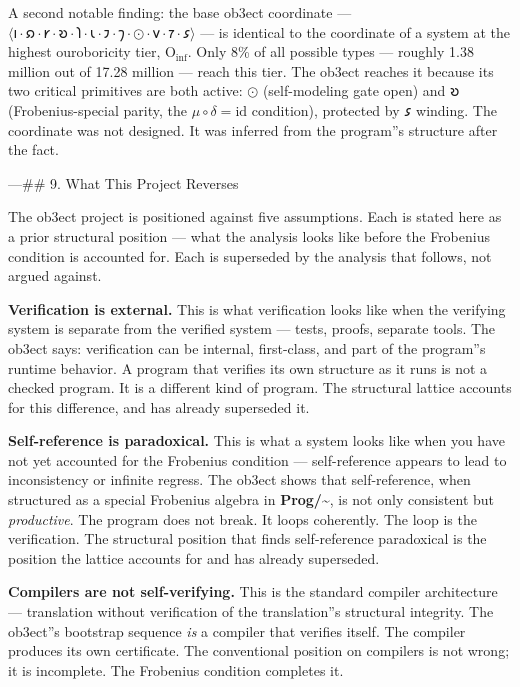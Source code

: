 \documentclass[12pt,a4paper]{article}
\begin{document}
A second notable finding: the base ob3ect coordinate --- $\langle \text{𐑦} \cdot \text{𐑸} \cdot \text{𐑾} \cdot \text{𐑹} \cdot \text{𐑐} \cdot \text{𐑧} \cdot \text{𐑲} \cdot \text{𐑠} \cdot \odot \cdot \text{𐑫} \cdot \text{𐑳} \cdot \text{𐑭} \rangle$ --- is identical to the coordinate of a system at the highest ouroboricity tier, $\text{O}_{\text{inf}}$. Only 8\% of all possible types --- roughly 1.38 million out of 17.28 million --- reach this tier. The ob3ect reaches it because its two critical primitives are both active: $\odot$ (self-modeling gate open) and $\text{𐑹}$ (Frobenius-special parity, the $\mu\circ\delta = \mathrm{id}$ condition), protected by $\text{𐑭}$ winding. The coordinate was not designed. It was inferred from the program''s structure after the fact.

---\#\# 9. What This Project Reverses

The ob3ect project is positioned against five assumptions. Each is stated here as a prior structural position --- what the analysis looks like before the Frobenius condition is accounted for. Each is superseded by the analysis that follows, not argued against.

\textbf{Verification is external.} This is what verification looks like when the verifying system is separate from the verified system --- tests, proofs, separate tools. The ob3ect says: verification can be internal, first-class, and part of the program''s runtime behavior. A program that verifies its own structure as it runs is not a checked program. It is a different kind of program. The structural lattice accounts for this difference, and has already superseded it.

\textbf{Self-reference is paradoxical.} This is what a system looks like when you have not yet accounted for the Frobenius condition --- self-reference appears to lead to inconsistency or infinite regress. The ob3ect shows that self-reference, when structured as a special Frobenius algebra in \textbf{Prog/\textasciitilde{}}, is not only consistent but \emph{productive}. The program does not break. It loops coherently. The loop is the verification. The structural position that finds self-reference paradoxical is the position the lattice accounts for and has already superseded.

\textbf{Compilers are not self-verifying.} This is the standard compiler architecture --- translation without verification of the translation''s structural integrity. The ob3ect''s bootstrap sequence \emph{is} a compiler that verifies itself. The compiler produces its own certificate. The conventional position on compilers is not wrong; it is incomplete. The Frobenius condition completes it.
\end{document}
